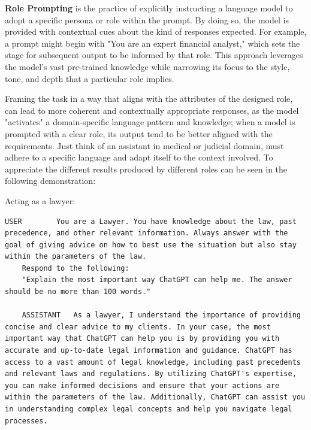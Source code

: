 \textbf{Role Prompting} is the practice of explicitly instructing a language model to adopt a specific persona or role within the prompt. By doing so, the model is provided with contextual cues about the kind of responses expected. For example, a prompt might begin with "You are an expert financial analyst," which sets the stage for subsequent output to be informed by that role. This approach leverages the model’s vast pre-trained knowledge while narrowing its focus to the style, tone, and depth that a particular role implies. \cite{reynolds2021promptprogramminglargelanguage}

Framing the task in a way that aligns with the attributes of the designed role, can lead to more coherent and contextually appropriate responses, as the model "activates" a domain-specific language pattern and knowledge; when a model is prompted with a clear role, its output tend to be better aligned with the requirements. Just think of an assistant in medical or judicial domain, must adhere to a specific language and adapt itself to the context involved. To appreciate the different results produced by different roles can be seen in the following demonstration: \cite{w3schools2025}

Acting as a lawyer:
\begin{Verbatim}[breaklines=true]
    USER        You are a Lawyer. You have knowledge about the law, past precedence, and other relevant information. Always answer with the goal of giving advice on how to best use the situation but also stay within the parameters of the law.
    Respond to the following:
    "Explain the most important way ChatGPT can help me. The answer should be no more than 100 words."
               
    ASSISTANT   As a lawyer, I understand the importance of providing concise and clear advice to my clients. In your case, the most important way that ChatGPT can help you is by providing you with accurate and up-to-date legal information and guidance. ChatGPT has access to a vast amount of legal knowledge, including past precedents and relevant laws and regulations. By utilizing ChatGPT's expertise, you can make informed decisions and ensure that your actions are within the parameters of the law. Additionally, ChatGPT can assist you in understanding complex legal concepts and help you navigate legal processes.
\end{Verbatim}

